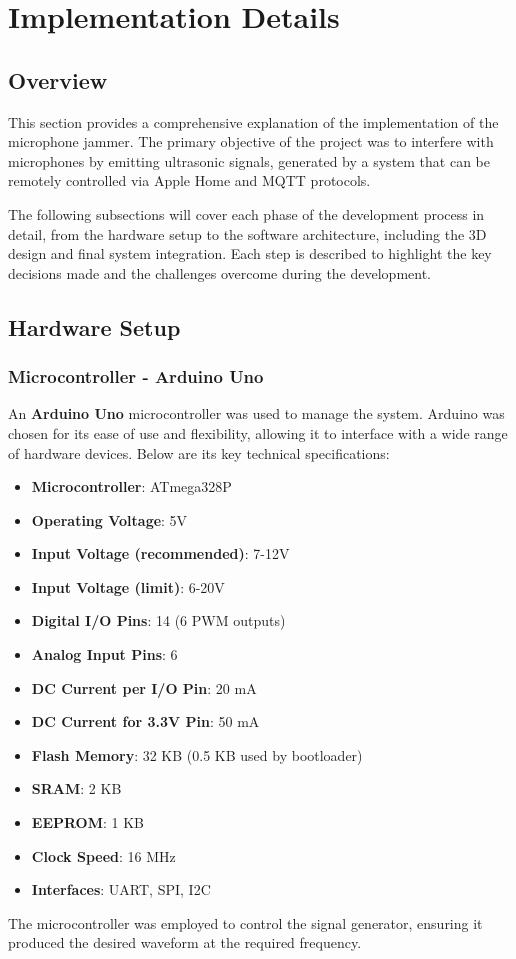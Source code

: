 \chapter{Implementation Details}

\section{Overview}

This section provides a comprehensive explanation of the implementation of the microphone jammer. The primary objective of the project was to interfere with microphones by emitting ultrasonic signals, generated by a system that can be remotely controlled via Apple Home and MQTT protocols.

The following subsections will cover each phase of the development process in detail, from the hardware setup to the software architecture, including the 3D design and final system integration. Each step is described to highlight the key decisions made and the challenges overcome during the development.


\section{Hardware Setup}

\subsection{Microcontroller - Arduino Uno}
An \textbf{Arduino Uno} \cite{Arduino} microcontroller was used to manage the system. Arduino was chosen for its ease of use and flexibility, allowing it to interface with a wide range of hardware devices. 
Below are its key technical specifications:
\begin{itemize}
    \item \textbf{Microcontroller}: ATmega328P
    \item \textbf{Operating Voltage}: 5V
    \item \textbf{Input Voltage (recommended)}: 7-12V
    \item \textbf{Input Voltage (limit)}: 6-20V
    \item \textbf{Digital I/O Pins}: 14 (6 PWM outputs)
    \item \textbf{Analog Input Pins}: 6
    \item \textbf{DC Current per I/O Pin}: 20 mA
    \item \textbf{DC Current for 3.3V Pin}: 50 mA
    \item \textbf{Flash Memory}: 32 KB (0.5 KB used by bootloader)
    \item \textbf{SRAM}: 2 KB
    \item \textbf{EEPROM}: 1 KB
    \item \textbf{Clock Speed}: 16 MHz
    \item \textbf{Interfaces}: UART, SPI, I2C
\end{itemize}
The microcontroller was employed to control the signal generator, ensuring it produced the desired waveform at the required frequency. 

